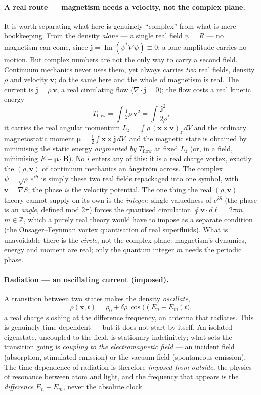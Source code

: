 \documentclass[11pt]{article}
\begin{document}
\paragraph{A real route --- magnetism needs a velocity, not the complex plane.} It is worth separating what
here is genuinely ``complex'' from what is mere bookkeeping. From the density \emph{alone} --- a single real
field $\psi=R$ --- no magnetism can come, since $\mathbf j=\operatorname{Im}(\psi^*\nabla\psi)\equiv0$: a lone
amplitude carries no motion. But complex numbers are not the only way to carry a second field. Continuum
mechanics never uses them, yet always carries \emph{two} real fields, density $\rho$ and velocity $\mathbf v$;
do the same here and the whole of magnetism is real. The current is $\mathbf j=\rho\,\mathbf v$, a real
circulating flow ($\nabla\!\cdot\mathbf j=0$); the flow costs a real kinetic energy
\[
T_{\text{flow}}=\int \tfrac12\rho\,\mathbf v^2=\int \frac{\mathbf j^2}{2\rho} ,
\]
it carries the real angular momentum $L_z=\int\rho\,(\mathbf x\times\mathbf v)_z\,dV$ and the ordinary
magnetostatic moment $\boldsymbol\mu=\tfrac12\int \mathbf x\times\mathbf j\,dV$, and the magnetic state is
obtained by minimising the static energy \emph{augmented by} $T_{\text{flow}}$ at fixed $L_z$ (or, in a field,
minimising $E-\boldsymbol\mu\!\cdot\!\mathbf B$). No $i$ enters any of this: it is a real charge vortex, exactly
the $(\rho,\mathbf v)$ of continuum mechanics an \aa ngstr\"om across. The complex $\psi=\sqrt\rho\,e^{iS}$ is
simply these two real fields repackaged into one symbol, with $\mathbf v=\nabla S$; the phase \emph{is} the
velocity potential. The one thing the real $(\rho,\mathbf v)$ theory cannot supply on its own is the
\emph{integer}: single-valuedness of $e^{iS}$ (the phase is an \emph{angle}, defined mod $2\pi$) forces the
quantised circulation $\oint\mathbf v\cdot d\boldsymbol\ell=2\pi m$, $m\in\mathbb Z$, which a purely real
theory would have to impose as a separate condition (the Onsager--Feynman vortex quantisation of real
superfluids). What is unavoidable there is the \emph{circle}, not the complex plane: magnetism's dynamics,
energy and moment are real; only the quantum integer $m$ needs the periodic phase.

\paragraph{Radiation --- an oscillating current (imposed).} A transition between two states makes the density
\emph{oscillate},
\[
\rho(\mathbf x,t)=\rho_0+\delta\rho\,\cos\!\big((E_n-E_m)t\big),
\]
a real charge sloshing at the difference frequency, an antenna that radiates. This is genuinely
time-dependent --- but it does not start by itself. An isolated eigenstate, uncoupled to the field, is
stationary indefinitely; what sets the transition going is \emph{coupling to the electromagnetic field} ---
an incident field (absorption, stimulated emission) or the vacuum field (spontaneous emission). The
time-dependence of radiation is therefore \emph{imposed from outside}, the physics of resonance between atom
and light, and the frequency that appears is the \emph{difference} $E_n-E_m$, never the absolute clock.
\end{document}
